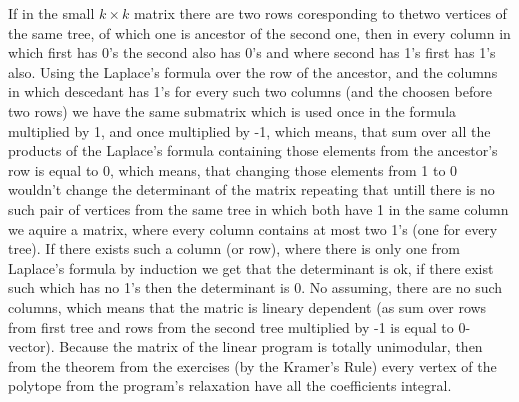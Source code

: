 \documentclass{article}
\begin{document}
If in the small $k\times k$ matrix there are two rows coresponding to thetwo vertices of the same tree, of which one is ancestor of the second one, then in every column in which first has 0's the second also has 0's
and where second has 1's first has 1's also.
Using the Laplace's formula over the row of the ancestor, and the columns in which descedant has 1's for every such two columns (and the choosen before two rows) we have the same submatrix which is used once in the formula
multiplied by 1, and once multiplied by -1, which means, that sum over all the products of the Laplace's formula containing those elements from the ancestor's row is equal to 0, which means, that changing those elements from
1 to 0 wouldn't change the determinant of the matrix repeating that untill there is no such pair of vertices from the same tree in which both have 1 in the same column we aquire a matrix, where every column contains
at most two 1's (one for every tree). If there exists such a column (or row), where there is only one from Laplace's formula by induction we get that the determinant is ok, if there exist such which has no 1's then the determinant is 0.
No assuming, there are no such columns, which means that the matric is lineary dependent (as sum over rows from first tree and rows from the second tree multiplied by -1 is equal to 0-vector).
Because the matrix of the linear program is totally unimodular, then from the theorem from the exercises (by the Kramer's Rule) every vertex of the polytope from the program's relaxation have all the coefficients integral.
\end{document}
